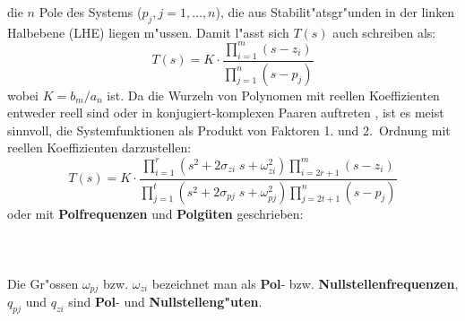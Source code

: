 {{{  die $n$ Pole des Systems ($p_{j}, j=1,\ldots, n$), die aus
  Stabilit"atsgr"unden in der linken
  Halbebene
  (LHE) liegen m"ussen.}}  Damit l"asst
sich $T(s)$ auch schreiben als:
\begin{equation}
T(s)=K \cdot\frac{{\displaystyle \prod_{i=1}^{m}} (s - z_{i})}
{{\displaystyle \prod_{j=1}^{n}} (s - p_{j})}
\end{equation}
wobei $K=b_{m}/a_{n}$ ist. {\bf{}}  Da
die Wurzeln von Polynomen mit reellen Koeffizienten
entweder reell sind oder in konjugiert-komplexen Paaren auftreten \cite{MOS:89}, ist
es meist sinnvoll, die Systemfunktionen als Produkt von Faktoren 1.
und 2.~Ordnung mit reellen Koeffizienten darzustellen:
\begin{equation}
T(s)=K \cdot\frac{{\displaystyle\prod_{i=1}^{r}} (s^{2} + 2\sigma_{zi}\; s + 
\omega_{zi}^{2})
{\displaystyle\prod_{i=2r+1}^{m}}(s - z_{i})} 
{{\displaystyle\prod_{j=1}^{t}} (s^{2} + 2\sigma_{pj}\; s + \omega_{pj}^{2})
{\displaystyle\prod_{j=2t+1}^{n}}(s - p_{j})}
\end{equation}  
oder mit {\bf Polfrequenzen} und {\bf Polg\"uten} geschrieben:\\~\\
  \\~\\
Die Gr"ossen $\omega_{pj}$ bzw. $\omega_{zi}$ bezeichnet man als
{\bf Pol}- bzw. {\bf Nullstellenfrequenzen}, $q_{pj}$
und $q_{zi}$ sind {\bf Pol}- und {\bf Nullstelleng"uten}.
}

